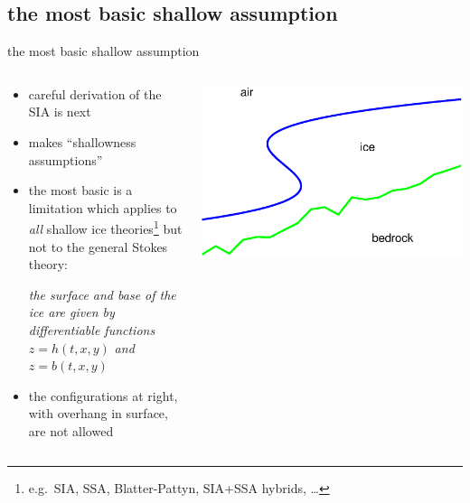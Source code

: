 \subsection{the most basic shallow assumption}

\begin{frame}{the most basic shallow assumption}

\begin{columns}

\begin{column}{0.6\textwidth}
\begin{itemize}
\item careful derivation of the SIA is next
\item makes ``shallowness assumptions''
\item the most basic is a limitation which applies to \emph{all} shallow ice theories\footnote{\tiny e.g.~SIA, SSA, Blatter-Pattyn, SIA+SSA hybrids, \dots} but not to the general Stokes theory:

\begin{center}
\emph{the surface and base of the ice are given by differentiable functions} $z=h(t,x,y)$ \emph{and} $z=b(t,x,y)$
\end{center}
\item the configurations at right, with overhang in surface, are not allowed
\end{itemize}
\end{column}

\begin{column}{0.4\textwidth}
\includegraphics[width=1.0\textwidth]{pdffigs/sshape}
\vspace{20mm}


\end{column}
\end{columns}
\end{frame}
